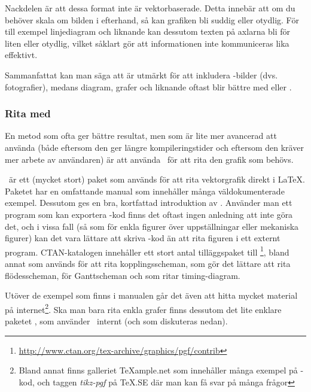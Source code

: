 \documentclass[lang=sv,ptsize=10pt,font=none,nomath,titles=bf,../../a4.tex]{subfiles}
\begin{document}
Nackdelen är att dessa format inte är vektorbaserade. Detta innebär att
om du behöver skala om bilden i efterhand, så kan grafiken bli suddig
eller otydlig. För till exempel linjediagram och liknande kan dessutom
texten på axlarna bli för liten eller otydlig, vilket såklart gör att
informationen inte kommuniceras lika effektivt. 

Sammanfattat kan man säga att  är utmärkt för att
inkludera \JPEG-bilder (dvs. fotografier), medans diagram, grafer och
liknande oftast blir bättre med \PGFTikZ eller .

\subsubsection{Rita med \PGFTikZ}
En metod som ofta ger bättre resultat, men som är lite mer avancerad att
använda (både eftersom den ger längre kompileringstider och eftersom den
kräver mer arbete av användaren) är att använda \PGFTikZ\ för att rita
den grafik som behövs.

\PGFTikZ\ är ett (mycket stort) paket som används för att rita
vektorgrafik direkt i \LaTeX. Paketet har en omfattande manual
\parencite{Tantau10} som innehåller många väldokumenterade exempel.
Dessutom ges en bra, kortfattad introduktion av \textcite{Mertz07}.
Använder man ett program som kan exportera \PGFTikZ-kod finns det oftast
ingen anledning att inte göra det, och i vissa fall (så som för enkla
figurer över uppställningar eller mekaniska figurer) kan det vara 
lättare att skriva \PGFTikZ-kod än att rita figuren i ett externt program.
CTAN-katalogen innehåller ett stort antal tilläggspaket till \PGFTikZ%
\footnote{\url{http://www.ctan.org/tex-archive/graphics/pgf/contrib}},
bland annat  \parencite{Redaelli12} som används
för att rita kopplingsscheman,  \parencite{Robson13}
som gör det lättare att rita flödesscheman, 
\parencite{Skala13} för Ganttscheman och 
\parencite{Scharrer11} som ritar timing-diagram.

Utöver de exempel som finns i manualen går det även att hitta mycket
material på internet\footnote{Bland annat finns galleriet
\TeX{}ample.net som innehåller 
många exempel på \PGFTikZ-kod, och taggen \emph{\mbox{tikz-pgf}} på
\TeX.SE
där man kan få svar på många frågor}. Ska man bara rita enkla grafer
finns dessutom det lite enklare paketet , som använder
\PGFTikZ\ internt (och som diskuteras nedan).%
%
\end{document}
